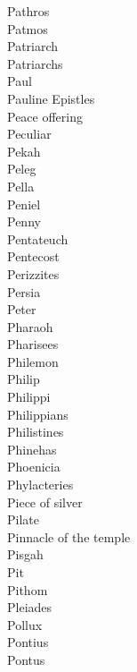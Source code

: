 Pathros  \\
Patmos  \\
Patriarch  \\
Patriarchs  \\
Paul  \\
Pauline Epistles  \\
Peace offering  \\
Peculiar  \\
Pekah  \\
Peleg  \\
Pella  \\
Peniel  \\
Penny  \\
Pentateuch  \\
Pentecost  \\
Perizzites  \\
Persia  \\
Peter  \\
Pharaoh  \\
Pharisees  \\
Philemon  \\
Philip  \\
Philippi  \\
Philippians  \\
Philistines  \\
Phinehas  \\
Phoenicia  \\
Phylacteries  \\
Piece of silver  \\
Pilate  \\
Pinnacle of the temple  \\
Pisgah  \\
Pit  \\
Pithom  \\
Pleiades  \\
Pollux  \\
Pontius  \\
Pontus  \\
